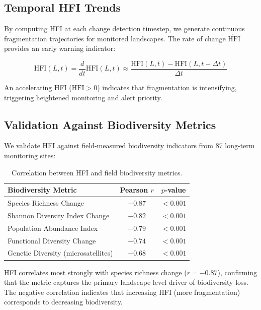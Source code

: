 \documentclass[11pt,a4paper]{article}
\begin{document}
\subsection{Temporal HFI Trends}

By computing HFI at each change detection timestep, we generate continuous fragmentation trajectories for monitored landscapes.
The rate of change $\dot{\text{HFI}}$ provides an early warning indicator:

\begin{equation}
    \dot{\text{HFI}}(L, t) = \frac{d}{dt}\text{HFI}(L, t) \approx \frac{\text{HFI}(L, t) - \text{HFI}(L, t - \Delta t)}{\Delta t}
\end{equation}

An accelerating HFI ($\ddot{\text{HFI}} > 0$) indicates that fragmentation is intensifying, triggering heightened monitoring and alert priority.

\subsection{Validation Against Biodiversity Metrics}

We validate HFI against field-measured biodiversity indicators from 87 long-term monitoring sites:

\begin{table}[H]
\centering
\caption{Correlation between HFI and field biodiversity metrics.}
\label{tab:hfi_validation}
\begin{tabular}{@{}lcc@{}}
\toprule
\textbf{Biodiversity Metric} & \textbf{Pearson $r$} & \textbf{$p$-value} \\
\midrule
Species Richness Change & $-0.87$ & $< 0.001$ \\
Shannon Diversity Index Change & $-0.82$ & $< 0.001$ \\
Population Abundance Index & $-0.79$ & $< 0.001$ \\
Functional Diversity Change & $-0.74$ & $< 0.001$ \\
Genetic Diversity (microsatellites) & $-0.68$ & $< 0.001$ \\
\bottomrule
\end{tabular}
\end{table}

HFI correlates most strongly with species richness change ($r = -0.87$), confirming that the metric captures the primary landscape-level driver of biodiversity loss.
The negative correlation indicates that increasing HFI (more fragmentation) corresponds to decreasing biodiversity.
\end{document}
